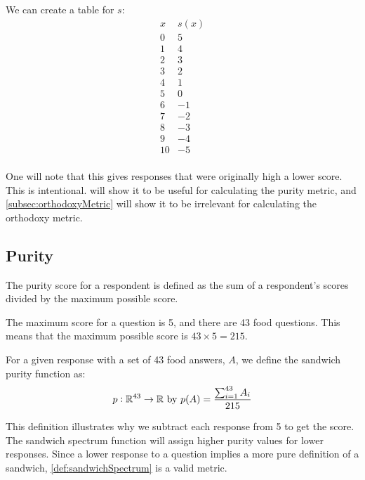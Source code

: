 We can create a table for $s$:
\begin{equation*}
	\begin{array}{l|r}
		x  & s(x)\\\hline
		0  &  5\\
		1  &  4\\
		2  &  3\\
		3  &  2\\
		4  &  1\\
		5  &  0\\
		6  & -1\\
		7  & -2\\
		8  & -3\\
		9  & -4\\
		10 & -5\\
	\end{array}
\end{equation*}

One will note that this gives responses that were originally high a lower score.
This is intentional.
 will show it to be useful for calculating the purity metric, and \cref{subsec:orthodoxyMetric} will show it to be irrelevant for calculating the orthodoxy metric.

\subsection{Purity}\label{subsec:purityMetric}
The purity score for a respondent is defined as the sum of a respondent's scores divided by the maximum possible score.

The maximum score for a question is 5, and there are 43 food questions.
This means that the maximum possible score is $43 \times 5 = 215$.

\begin{definition}
	For a given response with a set of 43 food answers, $A$, we define the sandwich purity function as:
	\begin{equation}
		p : \mathbb{R}^{43} \to \mathbb{R}\ \text{by}\ p(A) = \frac{\sum_{i = 1}^{43} A_i}{215}
	\end{equation}
\end{definition}

This definition illustrates why we subtract each response from 5 to get the score.
The sandwich spectrum function will assign higher purity values for lower responses.
Since a lower response to a question implies a more pure definition of a sandwich, \cref{def:sandwichSpectrum} is a valid metric.

